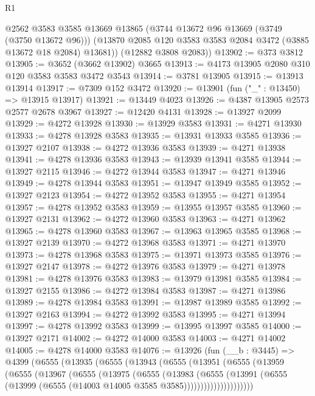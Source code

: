 \begin{lexlean}{R1}
\begin{coremodule}
        @2562
        @3583
        @3585
        @13669
        @13865
        (@3744 @13672 @96 @13669 (@3749 (@3750 @13672 @96)))
        (@13870 @2085 @120 @3583 @3583 @2084 @3472 (@3885 @13672 @18 @2084) @13681))
      (@12882 @3808 @2083))
@13902 := @373 @3812
@13905 := @3652 (@3662 @13902) @3665
@13913 := @4173 @13905 @2080 @310 @120 @3583 @3583 @3472 @3543
@13914 := @3781 @13905
@13915 := @13913 @13914
@13917 := @7309 @152 @3472
@13920 := @13901 (fun ("_" : @13450) => @13915 @13917)
@13921 := @13449 @4023
@13926 := @4387 @13905 @2573 @2577 @2678 @3967
@13927 := @12420 @4131
@13928 := @13927 @2099
@13929 := @4272 @13928
@13930 := @13929 @3583
@13931 := @4271 @13930
@13933 := @4278 @13928 @3583
@13935 := @13931 @13933 @3585
@13936 := @13927 @2107
@13938 := @4272 @13936 @3583
@13939 := @4271 @13938
@13941 := @4278 @13936 @3583
@13943 := @13939 @13941 @3585
@13944 := @13927 @2115
@13946 := @4272 @13944 @3583
@13947 := @4271 @13946
@13949 := @4278 @13944 @3583
@13951 := @13947 @13949 @3585
@13952 := @13927 @2123
@13954 := @4272 @13952 @3583
@13955 := @4271 @13954
@13957 := @4278 @13952 @3583
@13959 := @13955 @13957 @3585
@13960 := @13927 @2131
@13962 := @4272 @13960 @3583
@13963 := @4271 @13962
@13965 := @4278 @13960 @3583
@13967 := @13963 @13965 @3585
@13968 := @13927 @2139
@13970 := @4272 @13968 @3583
@13971 := @4271 @13970
@13973 := @4278 @13968 @3583
@13975 := @13971 @13973 @3585
@13976 := @13927 @2147
@13978 := @4272 @13976 @3583
@13979 := @4271 @13978
@13981 := @4278 @13976 @3583
@13983 := @13979 @13981 @3585
@13984 := @13927 @2155
@13986 := @4272 @13984 @3583
@13987 := @4271 @13986
@13989 := @4278 @13984 @3583
@13991 := @13987 @13989 @3585
@13992 := @13927 @2163
@13994 := @4272 @13992 @3583
@13995 := @4271 @13994
@13997 := @4278 @13992 @3583
@13999 := @13995 @13997 @3585
@14000 := @13927 @2171
@14002 := @4272 @14000 @3583
@14003 := @4271 @14002
@14005 := @4278 @14000 @3583
@14076 := @13926
    (fun (__b : @3445) =>
    @4399
      (@6555
        (@13935
          (@6555
            (@13943
              (@6555
                (@13951
                  (@6555
                    (@13959
                      (@6555
                        (@13967
                          (@6555
                            (@13975
                              (@6555
                                (@13983
                                  (@6555
                                    (@13991
                                      (@6555
                                        (@13999
                                          (@6555 (@14003 @14005 @3585 @3585)))))))))))))))))))))

\end{coremodule}
\end{lexlean}
